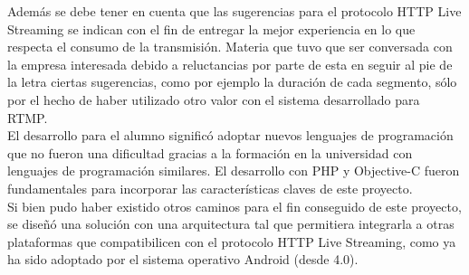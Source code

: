 Además se debe tener en cuenta que las sugerencias para el protocolo HTTP Live Streaming se indican con el fin de entregar la mejor experiencia en lo que respecta el consumo de la transmisión. Materia que tuvo que ser conversada con la empresa interesada debido a reluctancias por parte de esta en seguir al pie de la letra ciertas sugerencias, como por ejemplo la duración de cada segmento, sólo por el hecho de haber utilizado otro valor con el sistema desarrollado para RTMP.\\

El desarrollo para el alumno significó adoptar nuevos lenguajes de programación que no fueron una dificultad gracias a la formación en la universidad con lenguajes de programación similares. El desarrollo con PHP y Objective-C fueron fundamentales para incorporar las características claves de este proyecto.\\

Si bien pudo haber existido otros caminos para el fin conseguido de este proyecto, se diseñó una solución con una arquitectura tal que permitiera integrarla a otras plataformas que compatibilicen con el protocolo HTTP Live Streaming, como ya ha sido adoptado por el sistema operativo Android (desde 4.0). \\



	
		
	

